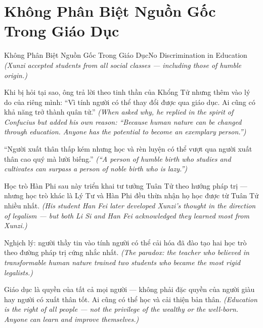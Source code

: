 \section{Không Phân Biệt Nguồn Gốc Trong Giáo Dục}
\begin{truyen}{Không Phân Biệt Nguồn Gốc Trong Giáo Dục}{No Discrimination in Education}
\textit{(Xunzi accepted students from all social classes — including those of humble origin.)}

Khi bị hỏi tại sao, ông trả lời theo tinh thần của Khổng Tử nhưng thêm vào lý do của riêng mình: ``Vì tính người có thể thay đổi được qua giáo dục. Ai cũng có khả năng trở thành quân tử.''
\textit{(When asked why, he replied in the spirit of Confucius but added his own reason: ``Because human nature can be changed through education. Anyone has the potential to become an exemplary person.'')}

``Người xuất thân thấp kém nhưng học và rèn luyện có thể vượt qua người xuất thân cao quý mà lười biếng.''
\textit{(``A person of humble birth who studies and cultivates can surpass a person of noble birth who is lazy.'')}

Học trò Hàn Phi sau này triển khai tư tưởng Tuân Tử theo hướng pháp trị — nhưng học trò khác là Lý Tư và Hàn Phi đều thừa nhận họ học được từ Tuân Tử nhiều nhất.
\textit{(His student Han Fei later developed Xunzi's thought in the direction of legalism — but both Li Si and Han Fei acknowledged they learned most from Xunzi.)}

Nghịch lý: người thầy tin vào tính người có thể cải hóa đã đào tạo hai học trò theo đường pháp trị cứng nhắc nhất.
\textit{(The paradox: the teacher who believed in transformable human nature trained two students who became the most rigid legalists.)}

\end{truyen}

\begin{baihoc}
Giáo dục là quyền của tất cả mọi người — không phải đặc quyền của người giàu hay người có xuất thân tốt. Ai cũng có thể học và cải thiện bản thân.
\textit{(Education is the right of all people — not the privilege of the wealthy or the well-born. Anyone can learn and improve themselves.)}
\end{baihoc}
